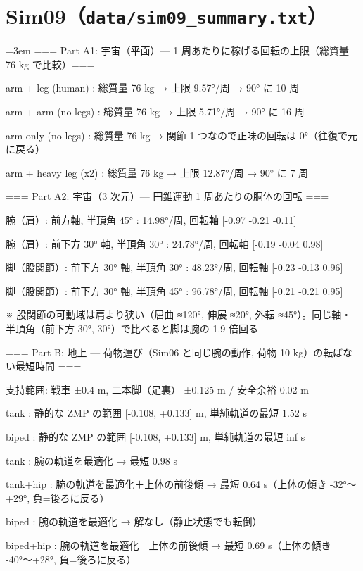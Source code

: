 \section{Sim09（\texttt{data/sim09\_summary.txt}）}
{\footnotesize\raggedright\sloppy\setlength{\parindent}{0pt}\setlength{\parskip}{0pt}\emergencystretch=3em
=== Part A1: 宇宙（平面）— 1 周あたりに稼げる回転の上限（総質量 76 kg で比較）===\par
  arm + leg (human)     : 総質量 76 kg → 上限  9.57°/周 → 90° に 10 周\par
  arm + arm (no legs)   : 総質量 76 kg → 上限  5.71°/周 → 90° に 16 周\par
  arm only (no legs)    : 総質量 76 kg → 関節 1 つなので正味の回転は 0°（往復で元に戻る）\par
  arm + heavy leg (x2)  : 総質量 76 kg → 上限 12.87°/周 → 90° に 7 周\par
\mbox{}\par
=== Part A2: 宇宙（3 次元）— 円錐運動 1 周あたりの胴体の回転 ===\par
  腕（肩）: 前方軸, 半頂角 45°              :  14.98°/周, 回転軸 [-0.97 -0.21 -0.11]\par
  腕（肩）: 前下方 30° 軸, 半頂角 30°        :  24.78°/周, 回転軸 [-0.19 -0.04  0.98]\par
  脚（股関節）: 前下方 30° 軸, 半頂角 30°      :  48.23°/周, 回転軸 [-0.23 -0.13  0.96]\par
  脚（股関節）: 前下方 30° 軸, 半頂角 45°      :  96.78°/周, 回転軸 [-0.21 -0.21  0.95]\par
  ※ 股関節の可動域は肩より狭い（屈曲 ≈120°, 伸展 ≈20°, 外転 ≈45°）。同じ軸・半頂角（前下方 30°, 30°）で比べると脚は腕の 1.9 倍回る\par
\mbox{}\par
=== Part B: 地上 — 荷物運び（Sim06 と同じ腕の動作, 荷物 10 kg）の転ばない最短時間 ===\par
  支持範囲: 戦車 ±0.4 m, 二本脚（足裏） ±0.125 m / 安全余裕 0.02 m\par
  tank  : 静的な ZMP の範囲 [-0.108, +0.133] m, 単純軌道の最短 1.52 s\par
  biped : 静的な ZMP の範囲 [-0.108, +0.133] m, 単純軌道の最短 inf s\par
  tank      : 腕の軌道を最適化 → 最短 0.98 s\par
  tank+hip  : 腕の軌道を最適化＋上体の前後傾 → 最短 0.64 s（上体の傾き -32°〜+29°, 負=後ろに反る）\par
  biped     : 腕の軌道を最適化 → 解なし（静止状態でも転倒）\par
  biped+hip : 腕の軌道を最適化＋上体の前後傾 → 最短 0.69 s（上体の傾き -40°〜+28°, 負=後ろに反る）\par
}

